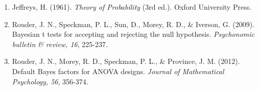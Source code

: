 \documentclass[11pt]{article}
\begin{document}
\begin{enumerate}
\item Jeffreys, H. (1961). \emph{Theory of Probability} (3rd ed.). Oxford University Press.
\item Rouder, J. N., Speckman, P. L., Sun, D., Morey, R. D., \& Iverson, G. (2009). Bayesian t tests for accepting and rejecting the null hypothesis. \emph{Psychonomic bulletin \& review, 16}, 225-237.
\item Rouder, J. N., Morey, R. D., Speckman, P. L., \& Province, J. M. (2012). Default Bayes factors for ANOVA designs. \emph{Journal of Mathematical Psychology, 56}, 356-374.
\end{enumerate}
\end{document}
